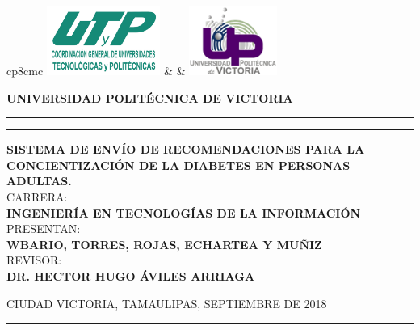 \documentclass[12pt]{article}
\date{\specialdate\today}
\newcommand{\HRule}{\rule{\linewidth}{0.25mm}}
\newcommand{\nproyecto}           {Sistema de envío de recomendaciones para la concientización de la diabetes en personas adultas.}
\newcommand{\nalumnoA}            {Wbario, Torres, Rojas, Echartea y Muñiz}
\newcommand{\ncarrera}            {Ingeniería en Tecnologías de la Información}
\newcommand{\nasesorinstitucional}{Dr. Hector Hugo Áviles Arriaga}
\newcommand{\fecha}               {Septiembre de 2018}
\newcommand{\separacionCorta}{0.0cm}
\newcommand{\separacionLarga}{0.5cm}
\newcommand{\iemph}[1]{\MakeTextUppercase{#1}}
\begin{document}
\setcounter{page}{1}
\thispagestyle{empty}
\begin{center}
\begin{tabular}{cp{8cm}c}
\includegraphics[height=2.25cm]{figuras/CGUTP2.png} & 
& \includegraphics[height=2.25cm]{figuras/LogoUPV.png}   \\
\end{tabular}
\Large \textbf{UNIVERSIDAD POLITÉCNICA DE VICTORIA}
\vspace{0.5cm}
\hrule
\vspace{0.1cm}
\hrule
\vspace{2.0cm}
\textbf{\iemph{\nproyecto}} \\[\separacionLarga]
CARRERA: \\
\textbf{\iemph{\ncarrera}} \\[\separacionLarga]
\vspace{1cm}
PRESENTAN: \\[\separacionCorta]
\textbf{\iemph{\nalumnoA}}\\[\separacionLarga]
\vspace{1.5cm}
REVISOR: \\[\separacionCorta]
\textbf{\iemph{\nasesorinstitucional}} \\[\separacionCorta]
\vspace{2.0cm}
\end{center}
\begin{flushright}
\iemph{Ciudad Victoria, Tamaulipas, \fecha}
\end{flushright}
\HRule 
\clearpage
\end{document}

